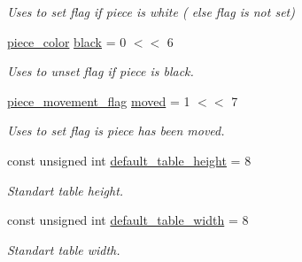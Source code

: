 \begin{DoxyCompactItemize}
\begin{DoxyCompactList}\small\item\em Uses to set flag if piece is white ( else flag is not set) \item\end{DoxyCompactList}\item 
\hypertarget{namespaceChEngn_aa2bfc6fe87969d3e28eecbb682e802c8}{
\hyperlink{namespaceChEngn_a9c81426c0134a97288a226c122daf62f}{piece\_\-color} \hyperlink{namespaceChEngn_aa2bfc6fe87969d3e28eecbb682e802c8}{black} = 0 $<$$<$ 6}
\label{namespaceChEngn_aa2bfc6fe87969d3e28eecbb682e802c8}

\begin{DoxyCompactList}\small\item\em Uses to unset flag if piece is black. \item\end{DoxyCompactList}\item 
\hypertarget{namespaceChEngn_a2997c391593541b72a894e9cf44c90bf}{
\hyperlink{namespaceChEngn_a491b2eba2f766087f4f28948005ab16a}{piece\_\-movement\_\-flag} \hyperlink{namespaceChEngn_a2997c391593541b72a894e9cf44c90bf}{moved} = 1 $<$$<$ 7}
\label{namespaceChEngn_a2997c391593541b72a894e9cf44c90bf}

\begin{DoxyCompactList}\small\item\em Uses to set flag is piece has been moved. \item\end{DoxyCompactList}\item 
\hypertarget{namespaceChEngn_ae87757a4f2d9ae9e25d48213cad79ddd}{
const unsigned int \hyperlink{namespaceChEngn_ae87757a4f2d9ae9e25d48213cad79ddd}{default\_\-table\_\-height} = 8}
\label{namespaceChEngn_ae87757a4f2d9ae9e25d48213cad79ddd}

\begin{DoxyCompactList}\small\item\em Standart table height. \item\end{DoxyCompactList}\item 
\hypertarget{namespaceChEngn_a9dc4a83c122aec6e170ad7a1d40efd8a}{
const unsigned int \hyperlink{namespaceChEngn_a9dc4a83c122aec6e170ad7a1d40efd8a}{default\_\-table\_\-width} = 8}
\label{namespaceChEngn_a9dc4a83c122aec6e170ad7a1d40efd8a}

\begin{DoxyCompactList}\small\item\em Standart table width. \item\end{DoxyCompactList}\end{DoxyCompactItemize}


